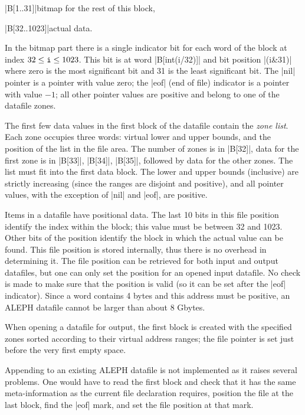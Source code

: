 \documentclass[titlepage]{article}
\newcommand\A{\textsf{ALEPH}}
\begin{document}
\HH\pp|B[1..31]|\HE bitmap for the rest of this block,

\HH\pp|B[32..1023]|\HE actual data.

\smallskip

\noindent
In the bitmap part there is a single indicator bit for each word of the
block at index
$32\le \mbox{\tt i} \le 1023$. This bit is at word \pp|B[int(i/32)]| and
bit position \pp|(i\&31)| where zero is the most significant bit and 31 is the
least significant bit. The \pp|nil| pointer is a pointer with value
zero; the \pp|eof| (end of file) indicator is a pointer with value
$-1$; all other pointer values are positive and belong to one of the
datafile zones.

The first few data values in the first block of the datafile contain the
\emph{zone list}. Each zone occupies three words: virtual lower and upper
bounds, and the position of the list in the file area. The number of zones
is in \pp|B[32]|, data for the first zone is in \pp|B[33]|, \pp|B[34]|,
\pp|B[35]|, followed by data for the other zones. The list must fit into the
first data block. The lower and upper bounds (inclusive) are strictly
increasing (since the ranges are disjoint and positive), and all
pointer values, with the exception of \pp|nil| and \pp|eof|, are
positive.

Items in a datafile have positional data. The last 10 bits in this
file position identify the index within the block; this value must be
between 32 and 1023. Other bits of the position identify the block in which
the actual value can be found. This file position is stored internally, thus
there is no overhead in determining it. The file position can be retrieved for
both input and output datafiles, but one can only set the position for an
opened input datafile. No check is made to make sure that the position is
valid (so it can be set after the \pp|eof| indicator). Since a word contains
4 bytes and this address must be positive, an \A{} datafile cannot be larger
than about 8 Gbytes.

When opening a datafile for output, the first block is created with the 
specified zones sorted according to their virtual address ranges; the
file pointer is set just before the very first empty space.

Appending to an existing \A{} datafile is not implemented as it raises
several problems. One would have to read the first block and check that it
has the same meta-information as the current file declaration requires,
position the file at the last block, find the \pp|eof| mark, and set the
file position at that mark.
\end{document}
